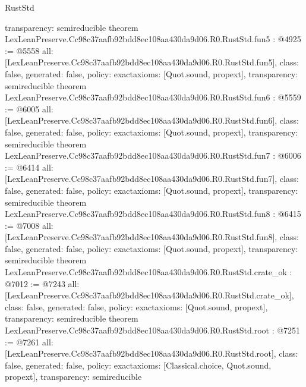 \begin{lexlean}{RustStd}
\begin{coremodule}
{  transparency: semireducible
}
theorem LexLeanPreserve.Cc98c37aafb92bdd8ec108aa430da9d06.R0.RustStd.fun5 : @4925 := @5558 {
  all: [LexLeanPreserve.Cc98c37aafb92bdd8ec108aa430da9d06.R0.RustStd.fun5],
  class: false,
  generated: false,
  policy: exact{axioms: [Quot.sound, propext]},
  transparency: semireducible
}
theorem LexLeanPreserve.Cc98c37aafb92bdd8ec108aa430da9d06.R0.RustStd.fun6 : @5559 := @6005 {
  all: [LexLeanPreserve.Cc98c37aafb92bdd8ec108aa430da9d06.R0.RustStd.fun6],
  class: false,
  generated: false,
  policy: exact{axioms: [Quot.sound, propext]},
  transparency: semireducible
}
theorem LexLeanPreserve.Cc98c37aafb92bdd8ec108aa430da9d06.R0.RustStd.fun7 : @6006 := @6414 {
  all: [LexLeanPreserve.Cc98c37aafb92bdd8ec108aa430da9d06.R0.RustStd.fun7],
  class: false,
  generated: false,
  policy: exact{axioms: [Quot.sound, propext]},
  transparency: semireducible
}
theorem LexLeanPreserve.Cc98c37aafb92bdd8ec108aa430da9d06.R0.RustStd.fun8 : @6415 := @7008 {
  all: [LexLeanPreserve.Cc98c37aafb92bdd8ec108aa430da9d06.R0.RustStd.fun8],
  class: false,
  generated: false,
  policy: exact{axioms: [Quot.sound, propext]},
  transparency: semireducible
}
theorem LexLeanPreserve.Cc98c37aafb92bdd8ec108aa430da9d06.R0.RustStd.crate_ok : @7012 := @7243 {
  all: [LexLeanPreserve.Cc98c37aafb92bdd8ec108aa430da9d06.R0.RustStd.crate_ok],
  class: false,
  generated: false,
  policy: exact{axioms: [Quot.sound, propext]},
  transparency: semireducible
}
theorem LexLeanPreserve.Cc98c37aafb92bdd8ec108aa430da9d06.R0.RustStd.root : @7251 := @7261 {
  all: [LexLeanPreserve.Cc98c37aafb92bdd8ec108aa430da9d06.R0.RustStd.root],
  class: false,
  generated: false,
  policy: exact{axioms: [Classical.choice, Quot.sound, propext]},
  transparency: semireducible
}


\end{coremodule}
\end{lexlean}
